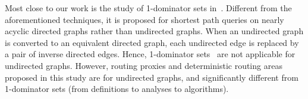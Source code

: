 Most close to our work is the study of 1-dominator sets in~\cite{SaundersT07}. Different from the aforementioned techniques, it is proposed for shortest path queries on nearly acyclic directed graphs rather than undirected graphs. When an undirected graph is converted to an equivalent directed graph, each undirected edge is replaced by a pair of inverse directed edges. Hence, 1-dominator sets~\cite{SaundersT07} are not applicable for undirected graphs. However, routing proxies and deterministic routing areas proposed in this study  are for undirected graphs,  and  significantly different from 1-dominator sets (from definitions to analyses to algorithms).








